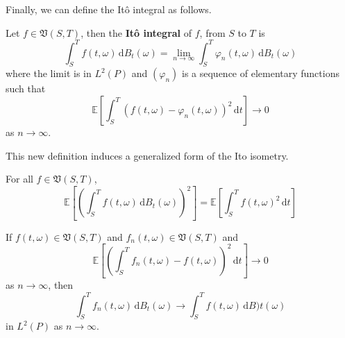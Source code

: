 Finally, we can define the Itô integral as follows.

\begin{definition}
	Let $f \in \mathfrak{V}(S,T)$, then the \textbf{Itô integral} of $f$, from $S$ to $T$ is
	\[
		\int_S^T f(t, \omega) \, \mathrm{d}B_t(\omega) = \lim_{n \to \infty} \int_S^T \varphi_n (t, \omega)  \, \mathrm{d}B_t(\omega)
	\]
	where the limit is in $L^2(P)$ and $(\varphi_n)$ is a sequence of elementary functions such that
	\[
		\mathbb{E} \left[ \int_S^T (f(t, \omega) - \varphi_n(t, \omega))^2 \, \mathrm{d}t \right] \longrightarrow 0
	\] 
	as $n \to \infty$.
\end{definition}

This new definition induces a generalized form of the Ito isometry.

\begin{theorem}
	For all $f \in \mathfrak{V}(S,T)$,	
	\[
		\mathbb{E}\left[\left( \int_S^T f(t,\omega) \, \mathrm{d}B_t(\omega) \right)^2 \right] = \mathbb{E} \left[\int_S^T f(t,\omega)^2 \, \mathrm{d}t \right]
	\]
\end{theorem}

\begin{corollary}
	If $f(t, \omega) \in \mathfrak{V}(S,T)$ and $f_n(t, \omega) \in \mathfrak{V}(S,T)$ and
	\[
		\mathbb{E}\left[\left( \int_S^T f_n(t,\omega) - f(t, \omega) \right)^2 \, \mathrm{d}t \right] \longrightarrow 0
		\]
	as $n \to \infty$, then
	\[
		\int_S^T f_n(t, \omega) \, \mathrm{d}B_t(\omega) \longrightarrow \int_S^T f(t, \omega) \, \mathrm{d} B)t(\omega)
	\]
	in $L^2(P)$ as $n \to \infty$.
\end{corollary}

